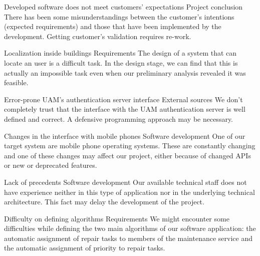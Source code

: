 \begin{risk}{Developed software does not meet customers' expectations}
\label{riskExpectations}
\riskcat Project conclusion
\riskdesc There has been some misunderstandings between the customer's intentions (expected requirements) and those that have been implemented by the development. Getting customer's validation requires re-work.
\end{risk}

\begin{risk}{Localization inside buildings}
\label{riskLocalization}
\riskcat Requirements
\riskdesc The design of a system that can locate an user is a difficult task. In the design stage, we can find that this is actually an impossible task even when our preliminary analysis revealed it was feasible.
\end{risk}

\begin{risk}{Error-prone UAM's authentication server interface}
\label{riskAuthServer}
\riskcat External sources
\riskdesc We don't completely trust that the interface with the UAM authentication server is well defined and correct. A defensive programming approach may be necessary.
\end{risk}

\begin{risk}{Changes in the interface with mobile phones}
\label{riskPhone}
\riskcat Software development
\riskdesc One of our target system are mobile phone operating systems. These are constantly changing and one of these changes may affect our project, either because of changed APIs or new or deprecated features.
\end{risk}

\begin{risk}{Lack of precedents}
\label{riskPrec}
\riskcat Software development
\riskdesc Our available technical staff does not have experience neither in this type of application nor in the underlying technical architecture. This fact may delay the development of the project.
\end{risk}

\begin{risk}{Difficulty on defining algorithms}
\label{riskAlgorithms}
\riskcat Requirements
\riskdesc We might encounter some difficulties while defining the two main algorithms of our software application: the automatic assignment of repair tasks to members of the maintenance service and the automatic assignment of priority to repair tasks.
\end{risk}

